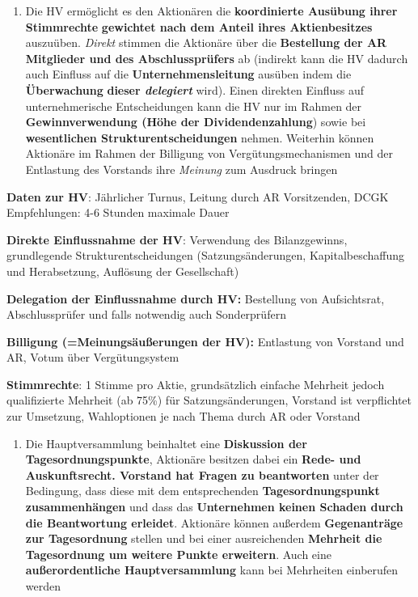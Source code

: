 \documentclass[
]{article}
\providecommand{\tightlist}{%
  \setlength{\itemsep}{0pt}\setlength{\parskip}{0pt}}
\begin{document}
\begin{enumerate}
\def\labelenumi{\arabic{enumi}.}
\tightlist
\item
  Die HV ermöglicht es den Aktionären die \textbf{koordinierte Ausübung
  ihrer Stimmrechte} \textbf{gewichtet nach dem Anteil ihres
  Aktienbesitzes} auszuüben. \emph{Direkt} stimmen die Aktionäre über
  die \textbf{Bestellung der AR Mitglieder und des Abschlussprüfers} ab
  (indirekt kann die HV dadurch auch Einfluss auf die
  \textbf{Unternehmensleitung} ausüben indem die \textbf{Überwachung}
  \textbf{dieser \emph{delegiert}} wird). Einen direkten Einfluss auf
  unternehmerische Entscheidungen kann die HV nur im Rahmen der
  \textbf{Gewinnverwendung (Höhe der Dividendenzahlung}) sowie bei
  \textbf{wesentlichen Strukturentscheidungen} nehmen. Weiterhin können
  Aktionäre im Rahmen der Billigung von Vergütungsmechanismen und der
  Entlastung des Vorstands ihre \emph{Meinung} zum Ausdruck bringen
\end{enumerate}

\textbf{Daten zur HV}: Jährlicher Turnus, Leitung durch AR Vorsitzenden,
DCGK Empfehlungen: 4-6 Stunden maximale Dauer

\textbf{Direkte Einflussnahme der HV}: Verwendung des Bilanzgewinns,
grundlegende Strukturentscheidungen (Satzungsänderungen,
Kapitalbeschaffung und Herabsetzung, Auflösung der Gesellschaft)

\textbf{Delegation der Einflussnahme durch HV: }Bestellung von
Aufsichtsrat, Abschlussprüfer und falls notwendig auch Sonderprüfern

\textbf{Billigung (=Meinungsäußerungen der HV): }Entlastung von Vorstand
und AR, Votum über Vergütungsystem

\textbf{Stimmrechte}: 1 Stimme pro Aktie, grundsätzlich einfache
Mehrheit jedoch qualifizierte Mehrheit (ab 75\%) für Satzungsänderungen,
Vorstand ist verpflichtet zur Umsetzung, Wahloptionen je nach Thema
durch AR oder Vorstand

\begin{enumerate}
\def\labelenumi{\arabic{enumi}.}
\tightlist
\item
  Die Hauptversammlung beinhaltet eine \textbf{Diskussion der
  Tagesordnungspunkte}, Aktionäre besitzen dabei ein \textbf{Rede- und
  Auskunftsrecht. Vorstand hat Fragen zu beantworten} unter der
  Bedingung, dass diese mit dem entsprechenden
  \textbf{Tagesordnungspunkt zusammenhängen} und dass das
  \textbf{Unternehmen keinen Schaden durch die Beantwortung erleidet}.
  Aktionäre können außerdem \textbf{Gegenanträge zur Tagesordnung}
  stellen und bei einer ausreichenden \textbf{Mehrheit die Tagesordnung
  um weitere Punkte erweitern}. Auch eine \textbf{außerordentliche
  Hauptversammlung} kann bei Mehrheiten einberufen werden
\end{enumerate}
\end{document}
